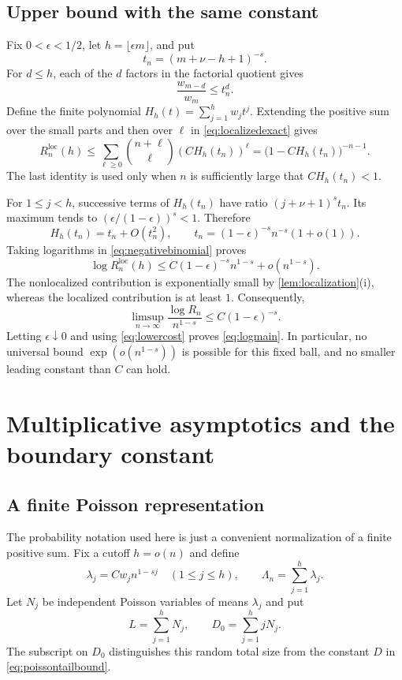 \documentclass[11pt,a4paper]{article}
\theoremstyle{definition}
\theoremstyle{remark}
\numberwithin{equation}{section}
\begin{document}
\subsection{Upper bound with the same constant}
Fix $0<\epsilon<1/2$, let $h=\lfloor\epsilon m\rfloor$, and put
\begin{equation}
 t_n=(m+\nu-h+1)^{-s}.
\end{equation}
For $d\le h$, each of the $d$ factors in the factorial quotient gives
\[
 \frac{w_{m-d}}{w_m}\le t_n^d.
\]
Define the finite polynomial $H_h(t)=\sum_{j=1}^h w_jt^j$.
Extending the positive sum over the small parts and then over $\ell$
in \eqref{eq:localizedexact} gives
\begin{equation}
 R_n^{\mathrm{loc}}(h)
 \le\sum_{\ell\ge0}\binom{n+\ell}{\ell}
                  (C H_h(t_n))^\ell
 =\bigl(1-C H_h(t_n)\bigr)^{-n-1}.
 \label{eq:negativebinomial}
\end{equation}
The last identity is used only when $n$ is sufficiently large that
$C H_h(t_n)<1$.

For $1\le j<h$, successive terms of $H_h(t_n)$ have ratio
$(j+\nu+1)^s t_n$. Its maximum tends to
$(\epsilon/(1-\epsilon))^s<1$. Therefore
\[
 H_h(t_n)=t_n+O(t_n^2),\qquad
 t_n=(1-\epsilon)^{-s}n^{-s}(1+o(1)).
\]
Taking logarithms in \eqref{eq:negativebinomial} proves
\[
 \log R_n^{\mathrm{loc}}(h)
 \le C(1-\epsilon)^{-s}n^{1-s}+o(n^{1-s}).
\]
The nonlocalized contribution is exponentially small by
\cref{lem:localization}(i), whereas the localized contribution is at
least $1$. Consequently,
\[
 \limsup_{n\to\infty}\frac{\log R_n}{n^{1-s}}
 \le C(1-\epsilon)^{-s}.
\]
Letting $\epsilon\downarrow0$ and using \eqref{eq:lowercost} proves
\eqref{eq:logmain}. In particular, no universal bound
$\exp(o(n^{1-s}))$ is possible for this fixed ball, and no smaller
leading constant than $C$ can hold.

\section{Multiplicative asymptotics and the boundary constant}
\label{sec:multcost}

\subsection{A finite Poisson representation}
The probability notation used here is just a convenient normalization of
a finite positive sum. Fix a cutoff $h=o(n)$ and define
\begin{equation}
 \lambda_j=Cw_j n^{1-sj}\quad(1\le j\le h),\qquad
 \Lambda_n=\sum_{j=1}^h\lambda_j.
 \label{eq:intensities}
\end{equation}
Let $N_j$ be independent Poisson variables of means $\lambda_j$ and put
\begin{equation}
 L=\sum_{j=1}^h N_j,\qquad D_0=\sum_{j=1}^h jN_j.
 \label{eq:poissonstats}
\end{equation}
The subscript on $D_0$ distinguishes this random total size from the
constant $D$ in \eqref{eq:poissontailbound}.
\end{document}
